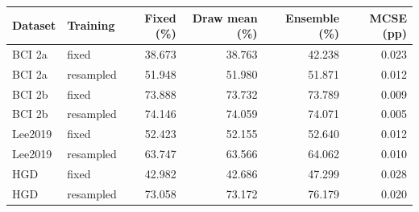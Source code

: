 \begin{tabular}{@{}llrrrr@{}}
\toprule
Dataset & Training & Fixed (\%) & Draw mean (\%) & Ensemble (\%) & MCSE (pp) \\
\midrule
BCI 2a & fixed & 38.673 & 38.763 & 42.238 & 0.023 \\
BCI 2a & resampled & 51.948 & 51.980 & 51.871 & 0.012 \\
BCI 2b & fixed & 73.888 & 73.732 & 73.789 & 0.009 \\
BCI 2b & resampled & 74.146 & 74.059 & 74.071 & 0.005 \\
Lee2019 & fixed & 52.423 & 52.155 & 52.640 & 0.012 \\
Lee2019 & resampled & 63.747 & 63.566 & 64.062 & 0.010 \\
HGD & fixed & 42.982 & 42.686 & 47.299 & 0.028 \\
HGD & resampled & 73.058 & 73.172 & 76.179 & 0.020 \\
\bottomrule
\end{tabular}
